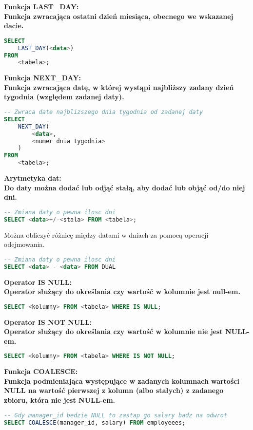 \documentclass[a4paper,12pt]{article}
\newcommand{\h}[1]{\noindent \bf #1 \rm \\ \noindent}
\begin{document}
\h{Funkcja LAST\_DAY:}
Funkcja zwracająca ostatni dzień miesiąca, obecnego we wskazanej dacie.
\begin{lstlisting}[language=SQL]
SELECT
	LAST_DAY(<data>)
FROM
	<tabela>;
\end{lstlisting}
\vspace{5mm}

\h{Funkcja NEXT\_DAY:}
Funkcja zwracająca datę, w której wystąpi najbliższy zadany dzień tygodnia (względem zadanej daty).
\begin{lstlisting}[language=SQL]
-- Zwraca date najblizszego dnia tygodnia od zadanej daty
SELECT
	NEXT_DAY(
		<data>,
		<numer dnia tygodnia>
	)
FROM
	<tabela>;
\end{lstlisting}
\vspace{5mm}

\h{Arytmetyka dat:}
Do daty można dodać lub odjąć stałą, aby dodać lub objąć od/do niej dni.
\begin{lstlisting}[language=SQL]
-- Zmiana daty o pewna ilosc dni
SELECT <data>+/-<stala> FROM <tabela>;
\end{lstlisting}
\vspace{5mm}

\noindent
Można obliczyć różnicę między datami w dniach za pomocą operacji odejmowania.
\begin{lstlisting}[language=SQL]
-- Zmiana daty o pewna ilosc dni
SELECT <data> - <data> FROM DUAL
\end{lstlisting}
\vspace{5mm}

\newpage
\h{Operator IS NULL:}
Operator służący do określania czy wartość w kolumnie jest null-em.
\begin{lstlisting}[language=SQL]
SELECT <kolumny> FROM <tabela> WHERE IS NULL;
\end{lstlisting}
\vspace{5mm}

\h{Operator IS NOT NULL:}
Operator służący do określania czy wartość w kolumnie nie jest NULL-em.
\begin{lstlisting}[language=SQL]
	SELECT <kolumny> FROM <tabela> WHERE IS NOT NULL;
\end{lstlisting}
\vspace{5mm}

\h{Funkcja COALESCE:}
Funkcja podmieniająca występujące w zadanych kolumnach wartości NULL na wartość pierwszej z kolumn (albo stałych) z zadanego zbioru, która nie jest NULL-em.
\begin{lstlisting}[language=SQL]
-- Gdy manager_id bedzie NULL to zastap go salary badz na odwrot
SELECT COALESCE(manager_id, salary) FROM employeees;
\end{lstlisting}
\vspace{5mm}
\end{document}

